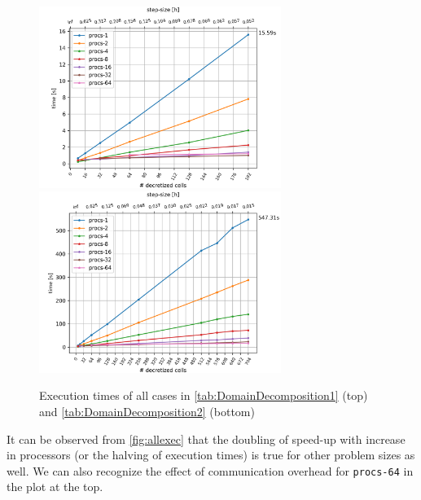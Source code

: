 \begin{figure}[H]
    \centering
    \includegraphics[width=0.7\textwidth]{figures/t301_const_proc_plot.png}
    \includegraphics[width=0.7\textwidth, trim = 0 0 0 0.5cm, clip]{figures/t401_const_proc_plot.png}
    \caption{Execution times of all cases in \autoref{tab:DomainDecomposition1} (top) and \autoref{tab:DomainDecomposition2} (bottom)}
    \label{fig:allexec}
\end{figure}

It can be observed from \autoref{fig:allexec} that the doubling of speed-up with increase in processors (or the halving of execution times) is true for other problem sizes as well. We can also recognize the effect of communication overhead for \texttt{procs-64} in the plot at the top.